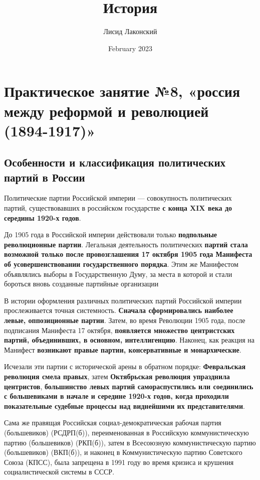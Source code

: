 \documentclass{article}
\title{История}
\author{Лисид Лаконский}
\date{February 2023}
\begin{document}
\raggedright

\maketitle
\tableofcontents
\pagebreak

\section{Практическое занятие №8, «россия между реформой и революцией (1894-1917)»}

\subsection{Особенности и классификация политических партий в России}

Политические партии Российской империи — совокупность политических партий, существовавших в российском государстве \textbf{с конца XIX века до середины 1920-х годов}.

\hfill

До 1905 года в Российской империи действовали только \textbf{подпольные революционные партии}. Легальная деятельность политических \textbf{партий стала возможной только после провозглашения 17 октября 1905 года Манифеста об усовершенствовании государственного порядка}. Этим же Манифестом объявлялись выборы в Государственную Думу, за места в которой и стали бороться вновь созданные партийные организации

\hfill

В истории оформления различных политических партий Российской империи прослеживается точная системность. \textbf{Сначала сформировались наиболее левые, оппозиционные партии}. Затем, во время Революции 1905 года, после подписания Манифеста 17 октября, \textbf{появляется множество центристских партий, объединивших, в основном, интеллигенцию}. Наконец, как реакция на Манифест \textbf{возникают правые партии, консервативные и монархические}.

Исчезали эти партии с исторической арены в обратном порядке: \textbf{Февральская революция смела правых}, затем \textbf{Октябрьская революция упразднила центристов}, \textbf{большинство левых партий самораспустились или соединились с большевиками в начале и середине 1920-х годов, когда проходили показательные судебные процессы над виднейшими их представителями}.

\hfill

Сама же правящая Российская социал-демократическая рабочая партия (большевиков) (РСДРП(б)), переименованная в Российскую коммунистическую партию (большевиков) (РКП(б)), затем в Всесоюзную коммунистическую партию (большевиков) (ВКП(б)), и наконец в Коммунистическую партию Советского Союза (КПСС), была запрещена в 1991 году во время кризиса и крушения социалистической системы в СССР. 
\end{document}
